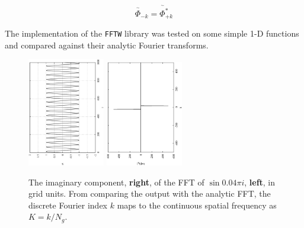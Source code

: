 \documentclass[10pt,a4paper]{article}
\begin{document}
\begin{equation}
\stackrel{{}_{\sim}\phantom{00|}}{\Phi_{-k}}=\stackrel{{}_{\sim}\phantom{00|}}{\Phi^{*}_{+k}}
\end{equation}

The implementation of the \texttt{FFTW} library was tested on some simple 1-D functions and compared against their analytic Fourier transforms.

\begin{figure}[h!]
\begin{center}
\includegraphics[width =0.3\textwidth, angle = -90]{sine.eps}
\includegraphics[width =0.3\textwidth, angle = -90]{sine_k.eps}
\caption{The imaginary component, \textbf{right}, of the FFT of $\sin{0.04\pi i}$, \textbf{left}, in grid units. From comparing the output with the analytic FFT, the discrete Fourier index $k$ maps to the continuous spatial frequency as $K=k/N_g$.}
\label{fig:tophat}
\end{center}
\end{figure}
\end{document}
